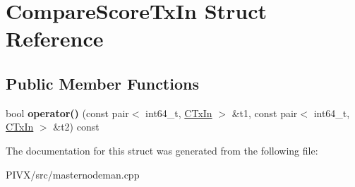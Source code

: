 \hypertarget{struct_compare_score_tx_in}{}\section{Compare\+Score\+Tx\+In Struct Reference}
\label{struct_compare_score_tx_in}
\subsection*{Public Member Functions}
\begin{DoxyCompactItemize}
\item 
\mbox{\label{struct_compare_score_tx_in_a74c297c50718515022c5850c3e324e26}} 
bool {\bfseries operator()} (const pair$<$ int64\+\_\+t, \mbox{\hyperlink{class_c_tx_in}{C\+Tx\+In}} $>$ \&t1, const pair$<$ int64\+\_\+t, \mbox{\hyperlink{class_c_tx_in}{C\+Tx\+In}} $>$ \&t2) const
\end{DoxyCompactItemize}


The documentation for this struct was generated from the following file\+:\begin{DoxyCompactItemize}
\item 
P\+I\+V\+X/src/masternodeman.\+cpp\end{DoxyCompactItemize}

